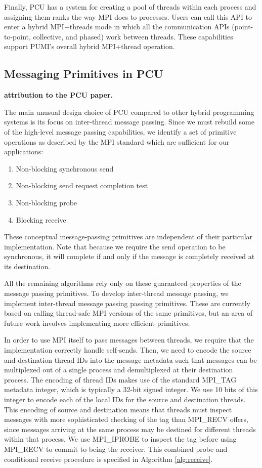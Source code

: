 Finally, PCU has a system for creating a pool of threads within each process and
assigning them ranks the way MPI does to processes.
Users can call this API to enter a hybrid MPI+threads mode in which all the
communication APIs (point-to-point, collective, and phased) work between
threads.
These capabilities support PUMI's overall hybrid MPI+thread operation.

\subsection{Messaging Primitives in PCU}
\label{sec:pcu_p2p}

{\bf attribution to the PCU paper.}

The main unusual design choice of PCU compared to
other hybrid programming systems is
its focus on inter-thread message passing.
Since we must rebuild some of the high-level message
passing capabilities, we identify a set of primitive
operations as described by the MPI standard \cite{walker1996mpi}
which are sufficient for our applications:

\begin{enumerate}
\item Non-blocking synchronous send
\item Non-blocking send request completion test
\item Non-blocking probe
\item Blocking receive
\end{enumerate}

These conceptual message-passing primitives are independent
of their particular implementation.
Note that because we require the send operation to be synchronous,
it will complete if and only if the message is completely received at its
destination.

All the remaining algorithms rely only on these guaranteed properties
of the message passing primitives.
To develop inter-thread message passing, we implement inter-thread
message passing passing primitives.
These are currently based on calling thread-safe MPI versions of the
same primitives, but an area of future work involves implementing
more efficient primitives.

In order to use MPI itself to pass messages between threads, we require
that the implementation correctly handle self-sends.
Then, we need to encode the source and destination thread IDs into the message
metadata such that messages can be multiplexed out of a single process
and demultiplexed at their destination process.
The encoding of thread IDs makes use of the standard MPI\_TAG metadata
integer, which is typically a 32-bit signed integer.
We use 10 bits of this integer to encode each of the local IDs for the
source and destination threads.
This encoding of source and destination means that threads must inspect
messages with more sophisticated checking of the tag than MPI\_RECV
offers, since messages arriving at the same process may be destined
for different threads within that process.
We use MPI\_IPROBE to inspect the tag before using MPI\_RECV to commit
to being the receiver.
This combined probe and conditional receive procedure is specified
in Algorithm \ref{alg:receive}.

